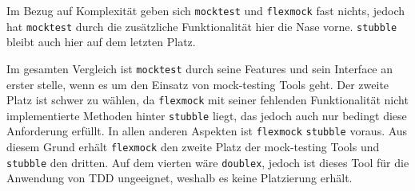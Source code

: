 Im Bezug auf Komplexität geben sich \lstinline{mocktest} und
\lstinline{flexmock} fast nichts, jedoch hat \lstinline{mocktest} durch die
zusätzliche Funktionalität hier die Nase vorne. \lstinline{stubble} bleibt auch
hier auf dem letzten Platz.
\newline

Im gesamten Vergleich ist \lstinline{mocktest} durch seine Features und sein
Interface an erster stelle, wenn es um den Einsatz von \gls{mock}-testing Tools
geht. Der zweite Platz ist schwer zu wählen, da \lstinline{flexmock} mit seiner
fehlenden Funktionalität nicht implementierte Methoden hinter
\lstinline{stubble} liegt, das jedoch auch nur bedingt diese Anforderung
erfüllt. In allen anderen Aspekten ist \lstinline{flexmock} \lstinline{stubble}
voraus. Aus diesem Grund erhält \lstinline{flexmock} den zweite Platz der
\gls{mock}-testing Tools und \lstinline{stubble} den dritten. Auf dem vierten
wäre \lstinline{doublex}, jedoch ist dieses Tool für die Anwendung von TDD
ungeeignet, weshalb es keine Platzierung erhält.